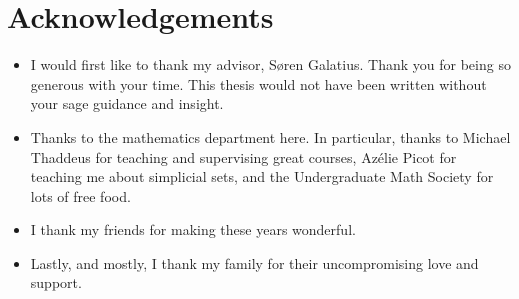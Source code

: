 \section*{Acknowledgements}
\begin{itemize}
\item I would first like to thank my advisor, S{\o}ren Galatius. Thank you for being so generous with your time. This thesis would not have been written without your sage guidance and insight.
\vspace{5pt}

\item Thanks to the mathematics department here. In particular, thanks to Michael Thaddeus for teaching and supervising great courses, Az{\'e}lie Picot for teaching me about simplicial sets, and the Undergraduate Math Society for lots of free food. 
\vspace{5pt}

\item I thank my friends for making these years wonderful.
\vspace{5pt}

\item Lastly, and mostly, I thank my family for their uncompromising love and support.
\end{itemize}
